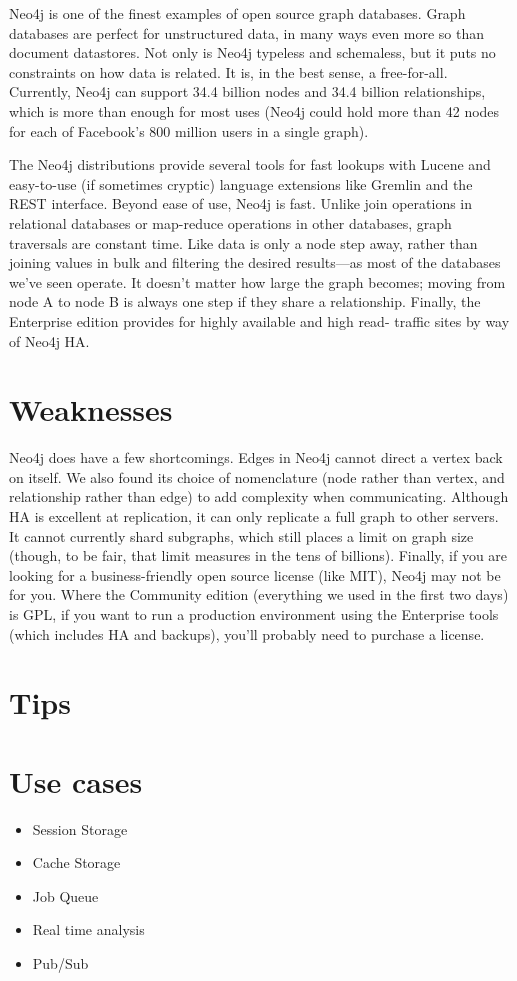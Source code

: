 Neo4j is one of the finest examples of open source graph databases. Graph databases are perfect for unstructured data, in many ways even more so than document datastores. Not only is Neo4j typeless and schemaless, but it puts no constraints on how data is related. It is, in the best sense, a free-for-all. Currently, Neo4j can support 34.4 billion nodes and 34.4 billion relationships, which is more than enough for most uses (Neo4j could hold more than 42 nodes for each of Facebook’s 800 million users in a single graph).

The Neo4j distributions provide several tools for fast lookups with Lucene and easy-to-use (if sometimes cryptic) language extensions like Gremlin and the REST interface. Beyond ease of use, Neo4j is fast. Unlike join operations in relational databases or map-reduce operations in other databases, graph traversals are constant time. Like data is only a node step away, rather than joining values in bulk and filtering the desired results—as most of the databases we’ve seen operate. It doesn’t matter how large the graph becomes; moving from node A to node B is always one step if they share a relationship. Finally, the Enterprise edition provides for highly available and high read- traffic sites by way of Neo4j HA.\cite{seven_databases}

\section{Weaknesses}

Neo4j does have a few shortcomings. Edges in Neo4j cannot direct a vertex back on itself. We also found its choice of nomenclature (node rather than vertex, and relationship rather than edge) to add complexity when communicating. Although HA is excellent at replication, it can only replicate a full graph to other servers. It cannot currently shard subgraphs, which still places a limit on graph size (though, to be fair, that limit measures in the tens of billions). Finally, if you are looking for a business-friendly open source license (like MIT), Neo4j may not be for you. Where the Community edition (everything we used in the first two days) is GPL, if you want to run a production environment using the Enterprise tools (which includes HA and backups), you’ll probably need to purchase a license.\cite{seven_databases}

\section{Tips}

\section{Use cases}

\begin{itemize}
  \item Session Storage
  \item Cache Storage
  \item Job Queue
  \item Real time analysis
  \item Pub/Sub
\end{itemize}